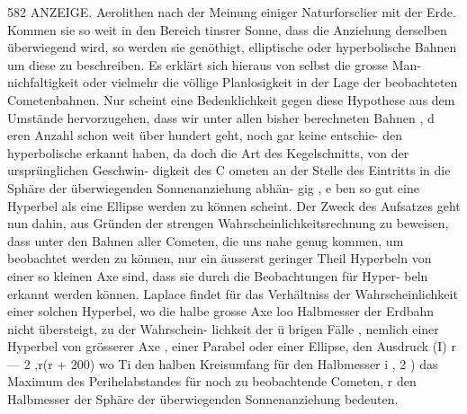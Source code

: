\documentclass[12pt,a4paper]{article}
\begin{document}
\newpage
582 ANZEIGE.\newline
Aerolithen nach der Meinung einiger Naturforsclier mit der Erde. Kommen sie so weit in den Bereich\newline
tinsrer Sonne, dass die Anziehung derselben überwiegend wird, so werden sie genöthigt, elliptische\newline
oder hyperbolische Bahnen um diese zu beschreiben. Es erklärt sich hieraus von selbst die grosse Man-\newline
nichfaltigkeit oder vielmehr die völlige Planlosigkeit in der Lage der beobachteten Cometenbahnen. Nur\newline
scheint eine Bedenklichkeit gegen diese Hypothese aus dem Umstände hervorzugehen, dass wir unter\newline
allen bisher berechneten Bahnen , d eren Anzahl schon weit über hundert geht, noch gar keine entschie-\newline
den hyperbolische erkannt haben, da doch die Art des Kegelschnitts, von der ursprünglichen Geschwin-\newline
digkeit des C ometen an der Stelle des Eintritts in die Sphäre der überwiegenden Sonnenanziehung abhän-\newline
gig , e ben so gut eine Hyperbel als eine Ellipse werden zu können scheint. Der Zweck des Aufsatzes\newline
geht nun dahin, aus Gründen der strengen Wahrscheinlichkeitsrechnung zu beweisen, dass unter den\newline
Bahnen aller Cometen, die uns nahe genug kommen, um beobachtet werden zu können, nur ein äusserst\newline
geringer Theil Hyperbeln von einer so kleinen Axe sind, dass sie durch die Beobachtungen für Hyper-\newline
beln erkannt werden können. Laplace findet für das Verhältniss der Wahrscheinlichkeit einer solchen\newline
Hyperbel, wo die halbe grosse Axe loo Halbmesser der Erdbahn nicht übersteigt, zu der Wahrschein-\newline
lichkeit der ü brigen Fälle , nemlich einer Hyperbel von grösserer Axe , einer Parabel oder einer Ellipse,\newline
den Ausdruck (I)\newline
r --- 2 ,r(r + 200)\newline
wo Ti den halben Kreisumfang für den Halbmesser i , 2 ) das Maximum des Perihelabstandes für noch zu\newline
beobachtende Cometen, r den Halbmesser der Sphäre der überwiegenden Sonnenanziehung bedeuten.\newline
\end{document}
